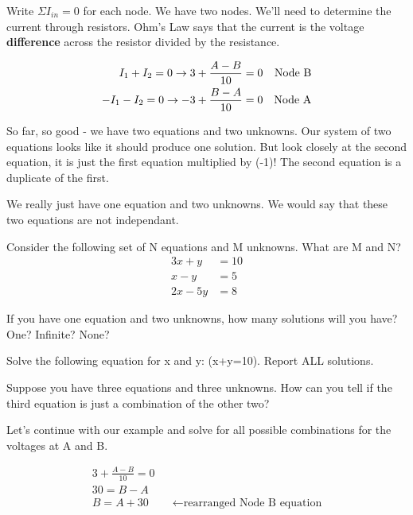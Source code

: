 Write $\Sigma I_{in}=0$ for each node. We have two nodes. We'll need to determine the current through resistors. Ohm's Law says that the current is the voltage \textbf{difference} across the resistor divided by the resistance. 
\par
\begin{align}
I_1+I_2=0 \rightarrow 3 + \frac{A-B}{10}=0&&\text{Node B} \label{E:4N}\\
-I_1-I_2=0 \rightarrow -3 + \frac{B-A}{10}=0&&\text{Node A} \notag 
\end{align} 

So far, so good - we have two equations and two unknowns. Our system of two equations looks like it should produce one solution. But look closely at the second equation, it is just the first equation multiplied by (-1)! The second equation is a duplicate of the first.\par

We really just have one equation and two unknowns. We would say that these two equations are not independant.\par

\begin{alevel}
Consider the following set of N equations and M unknowns. What are M and N?
\begin{align*}
3x+y&=10\\
x-y&=5\\
2x-5y&=8
\end{align*} 
\end{alevel}

\begin{blevel}
If you have one equation and two unknowns, how many solutions will you have? One? Infinite? None?
\end{blevel}

\begin{clevel}
Solve the following equation for x and y: (x+y=10). Report ALL solutions.
\end{clevel}

\begin{dlevel}
Suppose you have three equations and three unknowns. How can you tell if the third equation is just a combination of the other two?
\end{dlevel}

Let's continue with our example and solve for all possible combinations for the voltages at A and B.
\par
\begin{align*}
3 + \frac{A-B}{10}=0\tag{Node B}\\
30 = B-A\\
B = A+30&&\leftarrow \text{rearranged Node B equation}
\end{align*} 

